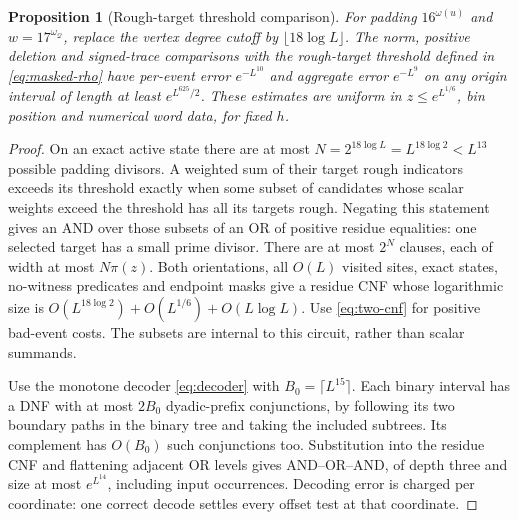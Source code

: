 \documentclass[11pt]{article}
\newtheorem{proposition}[theorem]{Proposition}
\theoremstyle{definition}
\theoremstyle{remark}
\numberwithin{equation}{section}
\newcommand{\Qset}{\mathcal Q}
\begin{document}
\begin{proposition}[Rough-target threshold comparison]\label{prop:threshold}
For padding $16^{\omega(u)}$ and $w=17^{\omega_{\Qset}}$, replace the vertex degree cutoff by
$\lfloor18\log L\rfloor$. The norm, positive deletion and signed-trace comparisons with the rough-target
threshold defined in \eqref{eq:masked-rho} have per-event error $e^{-L^{10}}$ and aggregate error $e^{-L^9}$ on
any origin interval of length at least $e^{L^{625}/2}$. These estimates are uniform in
$z\le e^{L^{1/6}}$, bin position and numerical word data, for fixed $h$.
\end{proposition}
\begin{proof}
On an exact active state there are at most
$N=2^{18\log L}=L^{18\log2}<L^{13}$ possible padding divisors.
A weighted sum of their target rough indicators exceeds its threshold exactly when some subset of candidates
whose scalar weights exceed the threshold has all its targets rough. Negating this statement gives an AND over
those subsets of an OR of positive residue equalities: one selected target has a small prime divisor.
There are at most $2^N$ clauses, each of width at most $N\pi(z)$. Both orientations, all $O(L)$ visited sites,
exact states, no-witness predicates and endpoint masks give a residue CNF whose logarithmic size is
$O(L^{18\log2})+O(L^{1/6})+O(L\log L)$.
Use \eqref{eq:two-cnf} for positive bad-event costs. The subsets are internal to this circuit, rather than scalar
summands.

Use the monotone decoder \eqref{eq:decoder} with $B_0=\lceil L^{15}\rceil$.
Each binary interval has a DNF with at most $2B_0$ dyadic-prefix conjunctions, by following its two boundary
paths in the binary tree and taking the included subtrees. Its complement has $O(B_0)$ such conjunctions too.
Substitution into the residue CNF and flattening adjacent OR levels gives AND--OR--AND, of depth three and size
at most $e^{L^{14}}$, including input occurrences. Decoding error is charged per coordinate: one correct decode
settles every offset test at that coordinate.


\end{proof}
\end{document}
